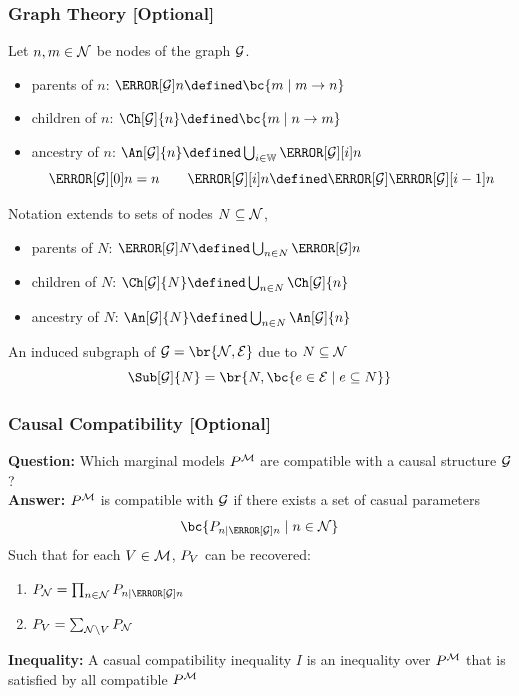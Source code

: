 \documentclass[
    hyperref={bookmarks=false},%
    xcolor={dvipsnames},
]{beamer}
\renewcommand{\term}[1]{\textcolor{Mahogany}{#1}}
\begin{document}
\begin{frame}
    \frametitle{Graph Theory [Optional]}
    Let $n, m \in \mathcal{N}$ be nodes of the graph $\mathcal{G}$.
    \begin{itemize}
        \item \term{parents of $n$}: $\Pa[\graph]{n} \defined \bc{m \mid m \to n}$
        \item \term{children of $n$}: $\Ch[\graph]{n} \defined \bc{m \mid n \to m}$
        \item \term{ancestry of $n$}: $\An[\graph]{n} \defined \bigcup_{i\in\mathbb{W}} \Pa[\graph][i]{n}$
        \[ \Pa[\graph][0]{n} = n \qquad \Pa[\graph][i]{n} \defined \Pa[\graph]{\Pa[\graph][i-1]{n}} \]
    \end{itemize}
    Notation extends to sets of nodes $N \subseteq \mathcal{N}$,
    \begin{itemize}
        \item \term{parents of $N$}: $\Pa[\graph]{N} \defined \bigcup_{n\in N}\Pa[\graph]{n}$
        \item \term{children of $N$}: $\Ch[\graph]{N} \defined \bigcup_{n\in N}\Ch[\graph]{n}$
        \item \term{ancestry of $N$}: $\An[\graph]{N} \defined \bigcup_{n\in N}\An[\graph]{n}$
    \end{itemize}
    An \term{induced subgraph} of $\graph = \br{\nodes, \edges}$ due to $N \subseteq \mathcal{N}$
    \[ \Sub[\graph]{N} = \br{N, \bc{e \in \edges \mid e \subseteq N}} \]
\end{frame}

\begin{frame}
    \frametitle{Causal Compatibility [Optional]}
    \textbf{Question:} Which marginal models $\prob^{\mscenario}$ are \term{compatible} with a causal structure $\mathcal{G}$?\\
    \textbf{Answer:} $\prob^{\mscenario}$ is compatible with $\mathcal{G}$ if there exists a set of \term{casual parameters}
    \[ \bc{\prob[n \mid \Pa[\graph]{n}] \mid n \in \nodes} \]
    Such that for each $V \in \mathcal{M}$, $\prob[V]$ can be recovered:
    \begin{enumerate}
        \item $\prob[\nodes] = \prod_{n\in\nodes}\prob[n \mid \Pa[\graph]{n}]$
        \item $\prob[V] = \sum_{\nodes \setminus V} \prob[\nodes]$
    \end{enumerate}
    \textbf{Inequality:} A \term{casual compatibility inequality} $I$ is an inequality over $\prob^{\mscenario}$ that is satisfied by all compatible $\prob^{\mscenario}$
\end{frame}
\end{document}

